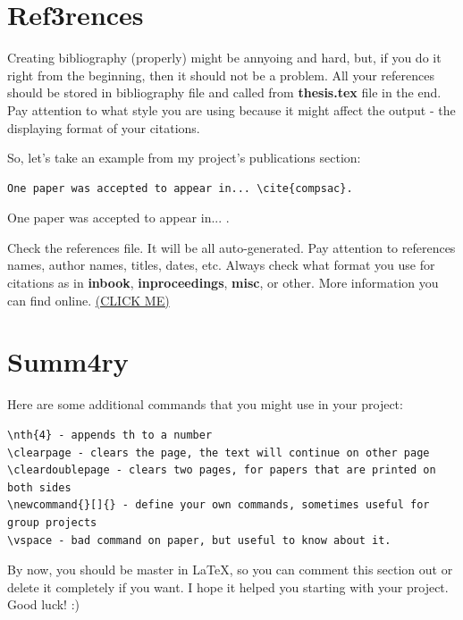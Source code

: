 \section{Ref3rences}
Creating bibliography (properly) might be annyoing and hard, but, if you do it right from the beginning, then it should not be a problem. All your references should be stored in bibliography file and called from \textbf{thesis.tex} file in the end. Pay attention to what style you are using because it might affect the output - the displaying format of your citations.

So, let's take an example from my project's publications section:

\begin{verbatim}
One paper was accepted to appear in... \cite{compsac}.
\end{verbatim}

One paper was accepted to appear in... \cite{compsac}.

Check the references file. It will be all auto-generated. Pay attention to references names, author names, titles, dates, etc. Always check what format you use for citations as in \textbf{inbook}, \textbf{inproceedings}, \textbf{misc}, or other. More information you can find online. \href{https://www.overleaf.com/learn/latex/bibliography_management_with_bibtex}{(CLICK ME)}


\section{Summ4ry}
Here are some additional commands that you might use in your project:

\begin{verbatim}
\nth{4} - appends th to a number
\clearpage - clears the page, the text will continue on other page
\cleardoublepage - clears two pages, for papers that are printed on both sides
\newcommand{}[]{} - define your own commands, sometimes useful for group projects
\vspace - bad command on paper, but useful to know about it.
\end{verbatim}

By now, you should be master in \LaTeX, so you can comment this section out or delete it completely if you want. I hope it helped you starting with your project. Good luck! :)



